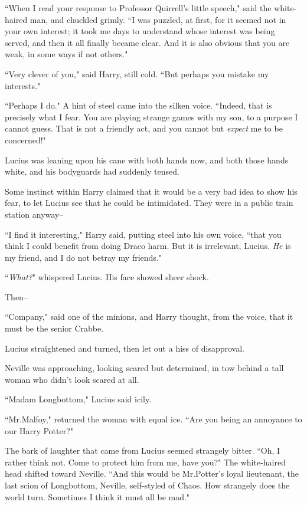 ``When I read your response to Professor Quirrell's little speech," said the white-haired man, and chuckled grimly. ``I was puzzled, at first, for it seemed not in your own interest; it took me days to understand whose interest was being served, and then it all finally became clear. And it is also obvious that you are weak, in some ways if not others."

``Very clever of you," said Harry, still cold. ``But perhaps you mistake my interests."

``Perhaps I do." A hint of steel came into the silken voice. ``Indeed, that is precisely what I fear. You are playing strange games with my son, to a purpose I cannot guess. That is not a friendly act, and you cannot but \emph{expect} me to be concerned!"

Lucius was leaning upon his cane with both hands now, and both those hands white, and his bodyguards had suddenly tensed.

Some instinct within Harry claimed that it would be a very bad idea to show his fear, to let Lucius see that he could be intimidated. They were in a public train station anyway\---

``I find it interesting," Harry said, putting steel into his own voice, ``that you think I could benefit from doing Draco harm. But it is irrelevant, Lucius. \emph{He} is my friend, and I do not betray my friends."

``\emph{What?}" whispered Lucius. His face showed sheer shock.

Then\---

``Company," said one of the minions, and Harry thought, from the voice, that it must be the senior Crabbe.

Lucius straightened and turned, then let out a hiss of disapproval.

Neville was approaching, looking scared but determined, in tow behind a tall woman who didn't look scared at all.

``Madam Longbottom," Lucius said icily.

``Mr.\?Malfoy," returned the woman with equal ice. ``Are you being an annoyance to our Harry Potter?"

The bark of laughter that came from Lucius seemed strangely bitter. ``Oh, I rather think not. Come to protect him from me, have you?" The white-haired head shifted toward Neville. ``And this would be Mr.\?Potter's loyal lieutenant, the last scion of Longbottom, Neville, self-styled of Chaos. How strangely does the world turn. Sometimes I think it must all be mad."


